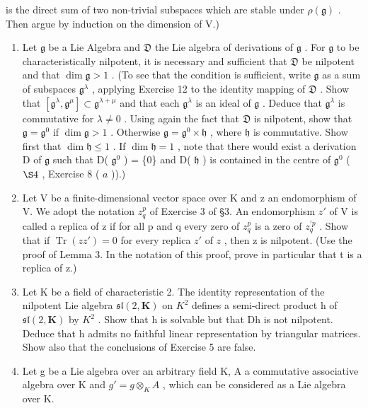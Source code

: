 is the direct sum of two non-trivial subspaces which are stable under \(\rho(\mathfrak{g})\) . Then argue by induction on the dimension of V.)

\begin{enumerate}
\def\labelenumi{\arabic{enumi}.}
\setcounter{enumi}{12}
\item
  Let \(\mathfrak{g}\) be a Lie Algebra and \(\mathfrak{D}\) the Lie algebra of derivations of \(\mathfrak{g}\) . For \(\mathfrak{g}\) to be characteristically nilpotent, it is necessary and sufficient that \(\mathfrak{D}\) be nilpotent and that \(\dim \mathfrak{g} > 1\) . (To see that the condition is sufficient, write \(\mathfrak{g}\) as a sum of subspaces \(\mathfrak{g}^{\lambda}\) , applying Exercise 12 to the identity mapping of \(\mathfrak{D}\) . Show that \([\mathfrak{g}^{\lambda}, \mathfrak{g}^{\mu}] \subset \mathfrak{g}^{\lambda + \mu}\) and that each \(\mathfrak{g}^{\lambda}\) is an ideal of \(\mathfrak{g}\) . Deduce that \(\mathfrak{g}^{\lambda}\) is commutative for \(\lambda \neq 0\) . Using again the fact that \(\mathfrak{D}\) is nilpotent, show that \(\mathfrak{g} = \mathfrak{g}^{0}\) if \(\dim \mathfrak{g} > 1\) . Otherwise \(\mathfrak{g} = \mathfrak{g}^{0} \times \mathfrak{h}\) , where \(\mathfrak{h}\) is commutative. Show first that \(\dim \mathfrak{h} \leqslant 1\) . If \(\dim \mathfrak{h} = 1\) , note that there would exist a derivation D of \(\mathfrak{g}\) such that D( \(\mathfrak{g}^{0}\) ) = \{0\} and D( \(\mathfrak{h}\) ) is contained in the centre of \(\mathfrak{g}^{0}\) ( \(\S 4\) , Exercise 8 ( \(a\) )).)
\item
  Let V be a finite-dimensional vector space over K and z an endomorphism of V. We adopt the notation \(z_{q}^{p}\) of Exercise 3 of §3. An endomorphism \(z'\) of V is called a replica of z if for all p and q every zero of \(z_{q}^{p}\) is a zero of \(z_{q}^{\prime p}\) . Show that if \(\operatorname{Tr}(zz') = 0\) for every replica \(z'\) of \(z\) , then z is nilpotent. (Use the proof of Lemma 3. In the notation of this proof, prove in particular that t is a replica of z.)
\item
  Let K be a field of characteristic 2. The identity representation of the nilpotent Lie algebra \(\mathfrak{sl}(2,\mathbf{K})\) on \(K^{2}\) defines a semi-direct product h of \(\mathfrak{sl}(2,\mathbf{K})\) by \(K^{2}\) . Show that h is solvable but that Dh is not nilpotent. Deduce that h admits no faithful linear representation by triangular matrices. Show also that the conclusions of Exercise 5 are false.
\item
  Let g be a Lie algebra over an arbitrary field K, A a commutative associative algebra over K and \(g' = g \otimes_{K} A\) , which can be considered as a Lie algebra over K.
\end{enumerate}

